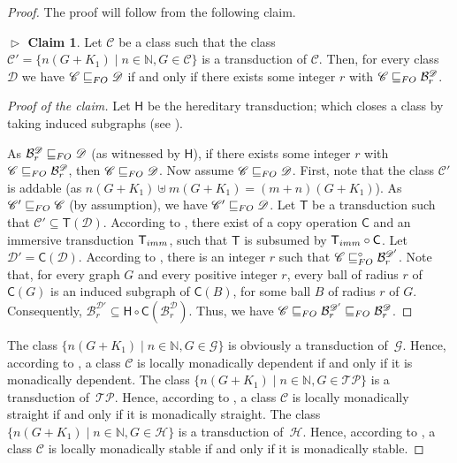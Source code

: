 \documentclass{lmcs}
\newcommand{\Cc}{\mathscr{C}}
\newcommand{\Dd}{\mathscr{D}}
\newcommand{\Gg}{\ensuremath{\mathscr G}}
\newcommand{\Hh}{\ensuremath{\mathscr H}}
\newcommand{\TP}{\ensuremath{\mathscr{T\!\!P}}}
\renewcommand{\FO}{{\rm FO}}
\newcommand{\rloc}[2]{\ensuremath{\mathcal{B}_{#1}^{#2}}}
\theoremstyle{definition}
\newtheorem{claim}[thm]{$\vartriangleright$ Claim} %
\newenvironment{claimproof}{\begin{proof}[Proof of the claim]
	\renewcommand\qedsymbol{$\vartriangleleft$}
}{\end{proof}}
\DeclareMathOperator{\join}{+}
\DeclareMathOperator{\union}{\uplus}
\begin{document}
 
\begin{proof}
	The proof will follow from the following claim. 

		\begin{claim}
\label{cl:golocal}
	Let $\Cc$ be a class such that the class $\Cc'=\{n(G\join K_1)\mid n\in\mathbb N, G\in\Cc\}$ is a transduction of $\Cc$. Then, for every class $\Dd$ we have
	$\Cc\sqsubseteq_\FO \Dd$ if and only if there exists some integer $r$ with $\Cc\sqsubseteq_\FO \rloc{r}{\Dd}$.
\end{claim}
\begin{claimproof}
	Let $\mathsf H$ be the hereditary transduction; which closes a class by taking induced subgraphs (see ).
	
	As $\rloc{r}{\Dd}\sqsubseteq_\FO \Dd$ (as witnessed by $\mathsf H$), if there exists some integer $r$ with $\Cc\sqsubseteq_\FO \rloc{r}{\Dd}$, then $\Cc\sqsubseteq_\FO \Dd$.
%
	Now assume  $\Cc\sqsubseteq_\FO\Dd$. 
		First, note that the class $\Cc'$ is addable (as $n(G+K_1)\union m(G+K_1)=(m+n)(G+K_1)$). 
	As $\Cc'\sqsubseteq_\FO\Cc$ (by assumption), we have 
	$\Cc'\sqsubseteq_\FO\Dd$. 
Let  $\mathsf T$ be a transduction such that $\Cc'\subseteq\mathsf T(\Dd)$.
	According to 	 
		  ,  there exist  of a copy operation $\mathsf C$ and an immersive transduction $\mathsf T_{\rm imm}$, such that $\mathsf T$ is subsumed by $\mathsf T_{\rm imm}\circ\mathsf C$. Let $\Dd'=\mathsf C(\Dd)$. According to , there is an integer $r$ such that $\Cc\sqsubseteq_\FO^\circ \rloc{r}{\Dd'}$.
		  Note that, for every graph $G$ and every positive integer $r$, every ball of radius $r$ of $\mathsf C(G)$ is an induced subgraph of $\mathsf C(B)$, for some ball $B$ of radius $r$ of $G$. Consequently,
		 $\rloc{r}{\Dd'}\subseteq \mathsf H\circ \mathsf C(\rloc{r}{\Dd})$. Thus, we have	$\Cc\sqsubseteq_\FO \rloc{r}{\Dd'}\sqsubseteq_\FO \rloc{r}{\Dd}$.
\end{claimproof}


		The class $\{n(G\join K_1)\mid n\in\mathbb N, G\in\Gg\}$ is obviously a transduction of~$\Gg$. Hence, according to , 
		a class $\Cc$ is locally monadically dependent if and only if it is monadically dependent.
	The class $\{n(G\join K_1)\mid n\in\mathbb N, G\in\TP\}$ is a  transduction of~$\TP$. Hence, according to , 
		a class $\Cc$ is locally monadically straight if and only if it is monadically straight.
		The class $\{n(G\join K_1)\mid n\in\mathbb N, G\in\Hh\}$ is a  transduction of~$\Hh$.
	Hence, according to , 
		a class $\Cc$ is locally monadically stable if and only if it is monadically stable.	
\end{proof}
\end{document}
